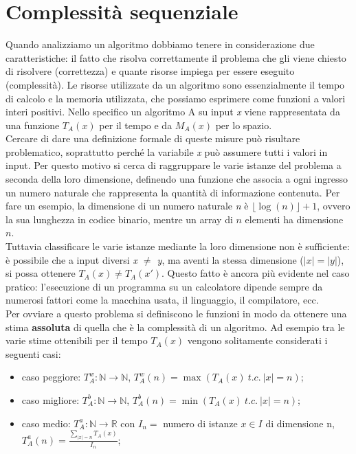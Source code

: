 \section{Complessità sequenziale}
Quando analizziamo un algoritmo dobbiamo tenere in considerazione due caratteristiche: il fatto che risolva correttamente il problema che gli viene chiesto di risolvere (correttezza) e quante risorse impiega per essere eseguito (complessità). Le risorse utilizzate da un algoritmo sono essenzialmente il tempo di calcolo e la memoria utilizzata, che possiamo esprimere come funzioni a valori interi positivi. Nello specifico un algoritmo A su input \textit{x} viene rappresentata da una funzione ${T}_{A}(x)$ per il tempo e da ${M}_{A}(x)$ per lo spazio.\\
Cercare di dare una definizione formale di queste misure può risultare problematico, soprattutto perché la variabile \textit{x} può assumere tutti i valori in input. Per questo motivo si cerca di raggruppare le varie istanze del problema a seconda della loro dimensione, definendo una funzione che associa a ogni ingresso un numero naturale che rappresenta la quantità di informazione contenuta. Per fare un esempio, la dimensione di un numero naturale \textit{n} è $\lfloor \log(n) \rfloor +1$, ovvero la sua lunghezza in codice binario, mentre un array di $n$ elementi ha dimensione $n$.\\
Tuttavia classificare le varie istanze mediante la loro dimensione non è sufficiente: è possibile che a input diversi \textit{x $\neq$ y}, ma aventi la stessa dimensione ($|x| = |y|$), si possa ottenere 
${T}_{A}(x) \neq {T}_{A}(x')$. Questo fatto è ancora più evidente nel caso pratico: l'esecuzione di un programma su un calcolatore dipende sempre da numerosi fattori come la macchina usata, il linguaggio, il compilatore, ecc.\\
Per ovviare a questo problema si definiscono le funzioni in modo da ottenere una stima \textbf{assoluta} di quella che è la complessità di un algoritmo. Ad esempio tra le varie stime ottenibili per il tempo ${T}_{A}(x)$ vengono solitamente considerati i seguenti casi:
\begin{itemize}
\item{caso peggiore: ${T}_{A}^w: \mathbb{N} \rightarrow \mathbb{N}$, ${T}_{A}^w(n) = \max({T}_{A}(x)\ t.c.\ |x| = n)$};
\item{caso migliore: ${T}_{A}^b: \mathbb{N} \rightarrow \mathbb{N}$, ${T}_{A}^b(n) = \min({T}_{A}(x)\ t.c.\ |x| = n)$};
\item{caso medio: ${T}_{A}^a: \mathbb{N} \rightarrow \mathbb{R}$ con $I_n = $ numero di istanze $x \in I$ di dimensione n, ${T}_{A}^a(n) = \frac{\sum \nolimits_{|x| = n} {T}_{A}(x)}{I_n}$};
\end{itemize}
